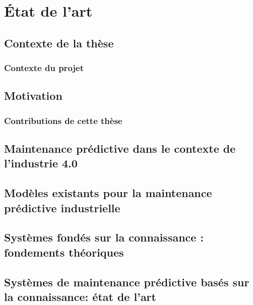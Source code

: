 \begin{otherlanguage}{French}
\chapter{État de l'art}
\normalsize
\label{ch1fran}
\adjustmtc
\adjustmtc

\section{Contexte de la thèse}
\subsection{Contexte du projet}

\section{Motivation}
\subsection{Contributions de cette thèse}

\section{Maintenance prédictive dans le contexte de l'industrie 4.0}
\label{ch2fran}

\section{Modèles existants pour la maintenance prédictive industrielle}
\label{ch3fran}

\section{Systèmes fondés sur la connaissance : fondements théoriques}
\label{ch4fran}

\section{Systèmes de maintenance prédictive basés sur la connaissance: état de l'art}
\label{ch5fran}

\end{otherlanguage}


